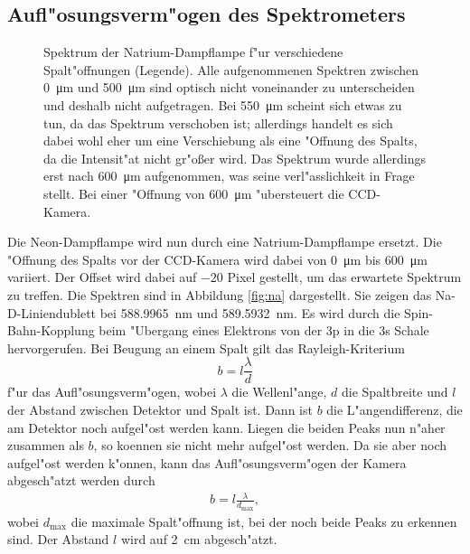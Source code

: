 \subsection{Aufl"osungsverm"ogen des Spektrometers}
\begin{figure}[htbp]
    \centering
    
    \caption{
        Spektrum der Natrium-Dampflampe f"ur verschiedene Spalt"offnungen (Legende).
        Alle aufgenommenen Spektren zwischen \SI{0}{\micro\metre} und \SI{500}{\micro\metre} sind optisch nicht voneinander zu unterscheiden und deshalb nicht aufgetragen.
        Bei \SI{550}{\micro\metre} scheint sich etwas zu tun, da das Spektrum verschoben ist; allerdings handelt es sich dabei wohl eher um eine Verschiebung als eine "Offnung des Spalts, da die Intensit"at nicht gr"o\ss er wird.
        Das Spektrum wurde allerdings erst nach \SI{600}{\micro\metre} aufgenommen, was seine verl"asslichkeit in Frage stellt.
        Bei einer "Offnung von \SI{600}{\micro\metre} "ubersteuert die CCD-Kamera.
    }
    \label{fig:na}
\end{figure}
Die Neon-Dampflampe wird nun durch eine Natrium-Dampflampe ersetzt.
Die "Offnung des Spalts vor der CCD-Kamera wird dabei von \SI{0}{\micro\metre} bis \SI{600}{\micro\metre} variiert.
Der Offset wird dabei auf $-20$ Pixel gestellt, um das erwartete Spektrum zu treffen.
Die Spektren sind in Abbildung \vref{fig:na} dargestellt.
Sie zeigen das Na-D-Liniendublett bei \SI{588,9965}{nm} und \SI{589,5932}{nm}.
Es wird durch die Spin-Bahn-Kopplung beim "Ubergang eines Elektrons von der 3p in die 3s Schale hervorgerufen.
\cite{NaD}
Bei Beugung an einem Spalt gilt das Rayleigh-Kriterium
\begin{equation}
b = l\frac{\lambda}{d}
\end{equation}
f"ur das Aufl"osungsverm"ogen, wobei $\lambda$ die Wellenl"ange, $d$ die Spaltbreite und $l$ der Abstand zwischen Detektor und Spalt ist.
Dann ist $b$ die L"angendifferenz, die am Detektor noch aufgel"ost werden kann.
Liegen die beiden Peaks nun n"aher zusammen als $b$, so koennen sie nicht mehr aufgel"ost werden.
Da sie aber noch aufgel"ost werden k"onnen, kann das Aufl"osungsverm"ogen der Kamera abgesch"atzt werden durch
\begin{align}
b = l\frac{\lambda}{d_\text{max}},
\end{align}
wobei $d_\text{max}$ die maximale Spalt"offnung ist, bei der noch beide Peaks zu erkennen sind.
Der Abstand $l$ wird auf \SI{2}{cm} abgesch"atzt.


